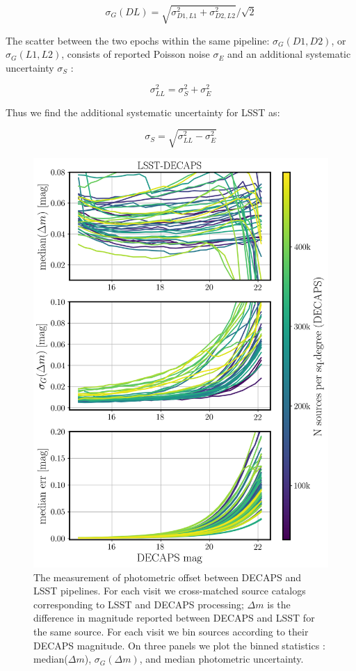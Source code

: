 \documentclass[DM,lsstdraft,toc,usenatbib,authoryear]{lsstdoc}
\begin{document}
\begin{equation}
\label{eq:spread}
\sigma_{G}(DL) = \sqrt{\sigma_{D1,L1}^{2} + \sigma_{D2,L2}^{2}} / \sqrt{2}
\end{equation}


The scatter between the two epochs within the same pipeline:   $\sigma_{G}(D1,D2)$, or $\sigma_{G}(L1,L2)$, consists of  reported Poisson noise $\sigma_{E} $ and an additional systematic uncertainty $\sigma_{S}$ :

\begin{equation}
\sigma_{LL}^{2} = \sigma_{S}^{2} + \sigma_{E}^{2}
\end{equation}

Thus we find  the additional systematic uncertainty for LSST as:

\begin{equation}
\label{eq:systematics}
\sigma_{S} = \sqrt{\sigma_{LL}^2  - \sigma_{E}^{2}}
\end{equation}




\begin{figure}
\begin{centering}
\includegraphics[width=0.7\columnwidth]{figs/decaps_lsst_rms_plot.png}
\caption{The measurement of photometric offset between DECAPS and LSST pipelines. For each visit we cross-matched source catalogs corresponding to LSST and DECAPS processing; $\Delta m$ is the difference in magnitude reported between DECAPS and LSST for the same source. For each visit we bin sources according to their DECAPS magnitude. On three panels we plot the binned statistics : median($\Delta m$),  $\sigma_{G}(\Delta m)$, and median photometric uncertainty.}
\label{fig:lsst_decaps_dmag}
\end{centering}
\end{figure}
\end{document}
